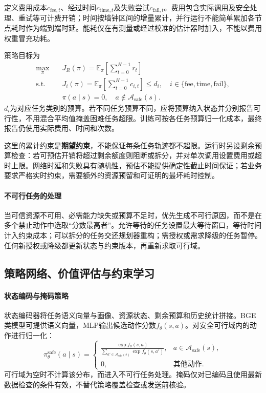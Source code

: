 定义费用成本$c_{\mathrm{fee},t}$、经过时间$c_{\mathrm{time},t}$及失败尝试$c_{\mathrm{fail},t}$。费用包含实际调用及安全处理、重试等可计费开销；时间按墙钟区间的增量累计，并行运行不能简单累加各节点耗时作为端到端时延。能耗仅在有测量或经过校准的估计器时加入，不能以费用权重冒充功耗。

策略目标为
\begin{equation}
\begin{aligned}
\max_{\pi}\quad &J_R(\pi)=
\mathbb{E}_{\pi}\!\left[\sum_{t=0}^{H-1}r_t\right]\\
\mathrm{s.t.}\quad &J_i(\pi)=
\mathbb{E}_{\pi}\!\left[\sum_{t=0}^{H-1}c_{i,t}\right]\leq d_i,
\quad i\in\{\mathrm{fee,time,fail}\},\\
&\pi(a\mid s)=0,\quad a\notin\mathcal{A}_{\mathrm{safe}}(s).
\end{aligned}
\label{eq:placement_cmdp}
\end{equation}
$d_i$为对应任务类别的预算。若不同任务预算不同，应将预算纳入状态并分别报告可行性，不用混合平均值掩盖困难任务超限。训练可按各任务预算归一化成本，最终报告仍使用实际费用、时间和次数。

这里的累计约束是\textbf{期望约束}，不能保证每条任务轨迹都不超限。运行时另设剩余预算检查：若可预估开销将超过剩余额度则阻断或拆分，并对单次调用设置费用或超时上限。网络时延和失败具有随机性，预估不能提供确定性截止时间保证；若业务要求严格实时约束，需要额外的资源预留和可证明的最坏耗时控制。

\paragraph{不可行任务的处理}
当可信资源不可用、必需能力缺失或预算不足时，优先生成不可行原因，而不是在多个禁止动作中选取“分数最高者”。允许等待的任务设置最大等待窗口，等待时间计入约束成本；可以拆分的任务交还规划器重构；需授权或需求降级的任务暂停。任何新授权或降级都更新状态与约束版本，再重新求取可行域。

\subsection{策略网络、价值评估与约束学习}

\paragraph{状态编码与掩码策略}
状态编码器将任务语义向量与画像、资源状态、剩余预算和历史统计拼接。BGE类模型可提供语义向量，MLP输出候选动作分数$f_{\theta}(s,a)$。对安全可行域内的动作进行归一化：
\begin{equation}
\pi_{\theta}^{\mathrm{safe}}(a\mid s)=
\begin{cases}
\displaystyle\frac{\exp f_{\theta}(s,a)}
{\sum_{a'\in\mathcal{A}_{\mathrm{safe}}(s)}\exp f_{\theta}(s,a')},
&a\in\mathcal{A}_{\mathrm{safe}}(s),\\[7pt]
0,&\text{其他动作}.
\end{cases}
\label{eq:placement_masked_policy}
\end{equation}
可行域为空时不计算该分布，而进入不可行任务处理。掩码仅对已编码且使用最新数据检查的条件有效，不替代策略覆盖检查或发送前核验。

